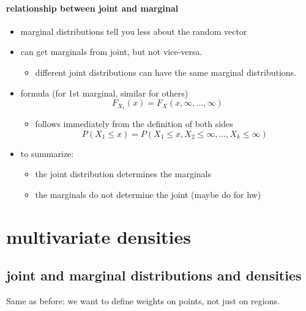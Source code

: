 \paragraph{relationship between joint and marginal}
\begin{itemize}
\item marginal distributions tell you less about the random vector
\item can get marginals from joint, but not vice-versa.
\begin{itemize}
\item different joint distributions can have the same marginal
          distributions.
\end{itemize}
\item formula (for 1st marginal, similar for others)
        \[ F_{X_1}(x) = F_X(x, \infty, \dots,\infty) \]
\begin{itemize}
\item follows immediately from the definition of both sides
          \[ P(X_1 \leq x) = P(X_1 \leq x, X_2 \leq \infty, \dots, X_k
          \leq \infty) \]
\end{itemize}
\item to summarize:
\begin{itemize}
\item the joint distribution determines the marginals
\item the marginals do not determine the joint (maybe do for hw)
\end{itemize}
\end{itemize}

\section{multivariate densities}
\subsection{joint and marginal distributions and densities}

      Same as before: we want to define weights on points, not just on
      regions.

